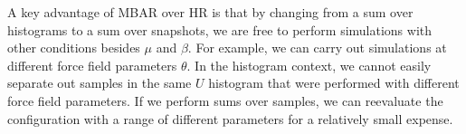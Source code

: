 \documentclass[journal=jced,manuscript=article]{achemso}
\begin{document}
%
%

A key advantage of MBAR over HR is that by changing from a sum over histograms to a sum over snapshots, we are free to perform simulations with other conditions besides $\mu$ and $\beta$. For example, we can carry out simulations at different force field parameters $\theta$. In the histogram context, we cannot easily separate out samples in the same $U$ histogram that were performed with different force field parameters. If we perform sums over samples, we can reevaluate the configuration with a range of different parameters for a relatively small expense.
\end{document}
